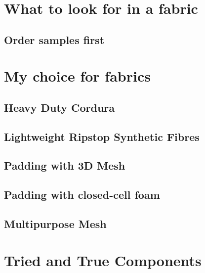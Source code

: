 \section{What to look for in a fabric}


\subsection{Order samples first}


\section{My choice for fabrics}

\subsection{Heavy Duty Cordura}


\subsection{Lightweight Ripstop Synthetic Fibres}


\subsection{Padding with 3D Mesh}


\subsection{Padding with closed-cell foam}

\subsection{Multipurpose Mesh}


\section{Tried and True Components}

